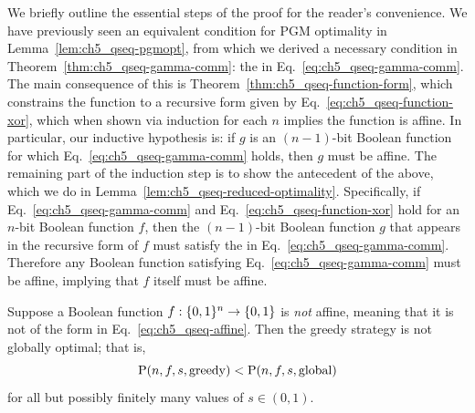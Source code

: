We briefly outline the essential steps of the proof for the reader's convenience.
We have previously seen an equivalent condition for PGM optimality in Lemma~\ref{lem:ch5_qseq-pgmopt}, from which we derived a necessary condition in Theorem~\ref{thm:ch5_qseq-gamma-comm}: the \gammacomm{} in Eq.~\eqref{eq:ch5_qseq-gamma-comm}.
The main consequence of this is Theorem~\ref{thm:ch5_qseq-function-form}, which constrains the function to a recursive form given by Eq.~\eqref{eq:ch5_qseq-function-xor}, which when shown via induction for each $n$ implies the function is affine.
In particular, our inductive hypothesis is: if $g$ is an $(n-1)$-bit Boolean function for which Eq.~\eqref{eq:ch5_qseq-gamma-comm} holds, then $g$ must be affine.
The remaining part of the induction step is to show the antecedent of the above, which we do in Lemma~\ref{lem:ch5_qseq-reduced-optimality}.
Specifically, if Eq.~\eqref{eq:ch5_qseq-gamma-comm} and Eq.~\eqref{eq:ch5_qseq-function-xor} hold for an $n$-bit Boolean function $f$, then the $(n-1)$-bit Boolean function $g$ that appears in the recursive form of $f$ must satisfy the \gammacomm{} in Eq.~\eqref{eq:ch5_qseq-gamma-comm}.
Therefore any Boolean function satisfying Eq.~\eqref{eq:ch5_qseq-gamma-comm} must be affine, implying that $f$ itself must be affine.

\begin{necessaryrestate}[Necessity]
    Suppose a Boolean function $f : \{ 0, 1 \}^n \to \{ 0, 1 \}$ is
    \emph{not} affine, meaning that it is not of the form in
    Eq.~\eqref{eq:ch5_qseq-affine}. Then the greedy strategy is not
    globally optimal; that is,
    \[
        \operatorname{P}(n,f,s,\mathrm{greedy}) < \operatorname{P}(n,f,s,\mathrm{global})
    \]
    for all but possibly finitely many values of $s\in(0,1)$.
\end{necessaryrestate}

